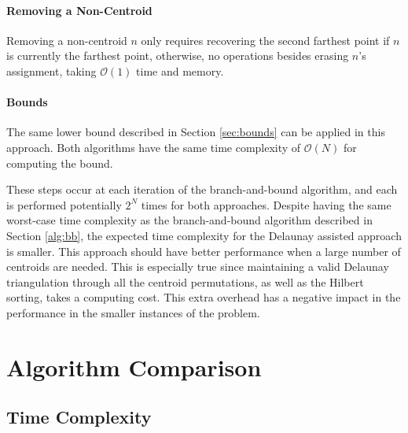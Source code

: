 \paragraph{Removing a Non-Centroid}
Removing a non-centroid $n$ only requires recovering the second farthest point if $n$ is currently the farthest point, otherwise, no operations besides erasing $n$'s assignment, taking $\mathcal{O}(1)$ time and memory.
\paragraph{Bounds}
The same lower bound described in Section \ref{sec:bounds} can be applied in this approach. Both algorithms have the same time complexity of $\mathcal{O}(N)$ for computing the bound.

These steps occur at each iteration of the branch-and-bound algorithm, and each is performed potentially $2^N$ times for both approaches.
Despite having the same worst-case time complexity as the branch-and-bound algorithm described in Section \ref{alg:bb}, the expected time complexity for the Delaunay assisted approach is smaller. This approach should have better performance when a large number of centroids are needed.
This is especially true since maintaining a valid Delaunay triangulation through all the centroid permutations, as well as the Hilbert sorting, takes a computing cost. This extra overhead has a negative impact in the performance in the smaller instances of the problem.
\section{Algorithm Comparison}

\subsection{Time Complexity}

